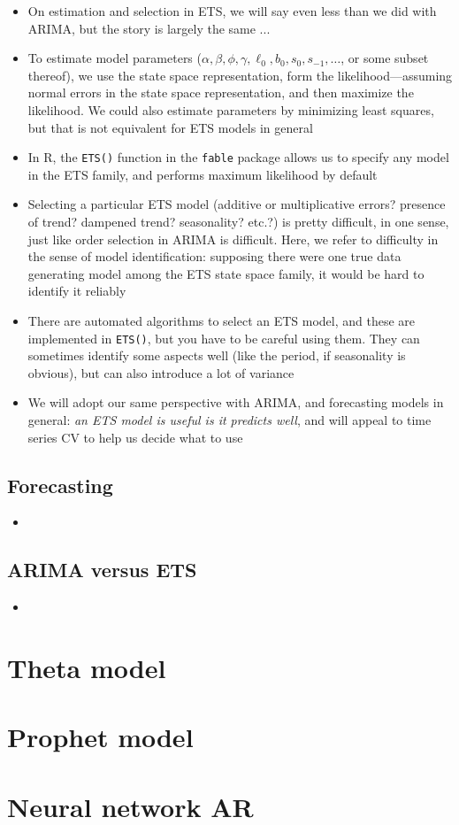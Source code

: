 \documentclass{article}
\begin{document}
\begin{itemize}
\item On estimation and selection in ETS, we will say even less than we did with
  ARIMA, but the story is largely the same ...

\item To estimate model parameters
  ($\alpha,\beta,\phi,\gamma,\ell_0,b_0,s_0,s_{-1},\dots$, or some subset
  thereof), we use the state space representation, form the
  likelihood---assuming normal errors in the state space representation, and
  then maximize the likelihood. We could also estimate parameters by minimizing
  least squares, but that is not equivalent for ETS models in general 

\item In R, the \verb|ETS()| function in the \verb|fable| package allows us to
  specify any model in the ETS family, and performs maximum likelihood by
  default 

\item Selecting a particular ETS model (additive or multiplicative errors?
  presence of trend? dampened trend? seasonality? etc.?) is pretty difficult, in
  one sense, just like order selection in ARIMA is difficult. Here, we refer to
  difficulty in the sense of model identification: supposing there were one true
  data generating model among the ETS state space family, it would be hard to
  identify it reliably 

\item There are automated algorithms to select an ETS model, and these are
  implemented in \verb|ETS()|, but you have to be careful using them. They can
  sometimes identify some aspects well (like the period, if seasonality is
  obvious), but can also introduce a lot of variance 

\item We will adopt our same perspective with ARIMA, and forecasting models in
  general: \emph{an ETS model is useful is it predicts well}, and will appeal to
  time series CV to help us decide what to use 
\end{itemize}

\subsection{Forecasting}

\begin{itemize}
\item 
\end{itemize}

\subsection{ARIMA versus ETS}
\begin{itemize}
\item 
\end{itemize}

\section{Theta model}

\section{Prophet model}

\section{Neural network AR}
\end{document}
